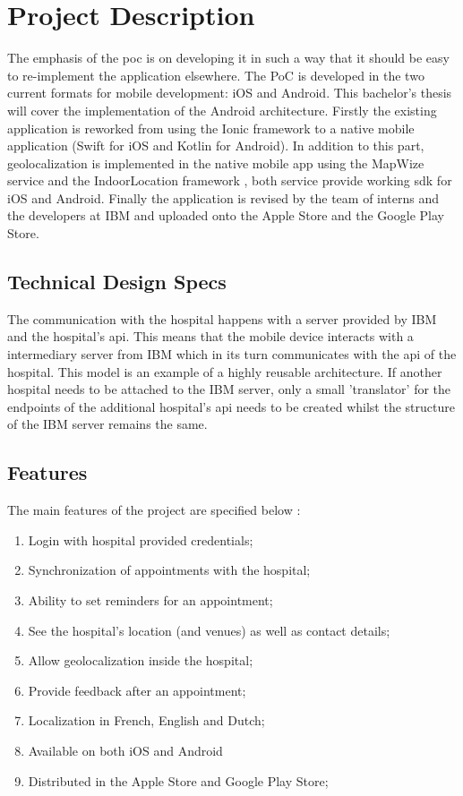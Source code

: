 \section{Project Description}
The emphasis of the \acrshort{poc} is on developing it in such a way that it should be easy to re-implement the application elsewhere. The PoC is developed in the two current formats for mobile development: iOS and Android. This bachelor's thesis will cover the implementation of the Android architecture. Firstly the existing application is reworked from using the Ionic framework to a native mobile application (Swift for iOS and Kotlin for Android). In addition to this part, geolocalization is implemented in the native mobile app using the MapWize service \cite{MapWize.io2019} and the IndoorLocation framework \cite{IndoorLocation.io2019}, both service provide working \acrfull{sdk} for iOS and Android. Finally the application is revised by the team of interns and the developers at IBM and uploaded onto the Apple Store and the Google Play Store.
\subsection{Technical Design Specs}
The communication with the hospital happens with a server provided by IBM and the hospital's \acrfull{api}. This means that the mobile device interacts with a intermediary server from IBM which in its turn communicates with the \acrshort{api} of the hospital. This model is an example of a highly reusable architecture. If another hospital needs to be attached to the IBM server, only a small 'translator' for the endpoints of the additional hospital's \acrshort{api} needs to be created whilst the structure of the IBM server remains the same.
\subsection{Features}
The main features of the project are specified below \cite{medappspec}:
\begin{enumerate}
\item Login with hospital provided credentials;
\item Synchronization of appointments with the hospital;
\item Ability to set reminders for an appointment;
\item See the hospital's location (and venues) as well as contact details;
\item Allow geolocalization inside the hospital;
\item Provide feedback after an appointment;
\item Localization in French, English and Dutch;
\item Available on both iOS and Android
\item Distributed in the Apple Store and Google Play Store;
\end{enumerate}
